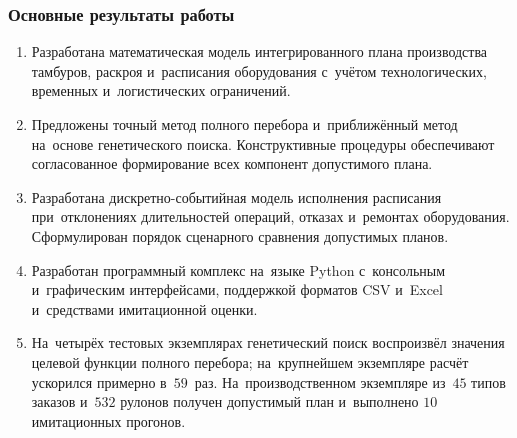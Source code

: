 \begin{frame}[t,allowframebreaks]
    \frametitle{Основные результаты работы}
    \small
    \begin{enumerate}
        \item Разработана математическая модель интегрированного плана производства тамбуров, раскроя и~расписания оборудования с~учётом технологических, временных и~логистических ограничений.
        \item Предложены точный метод полного перебора и~приближённый метод на~основе генетического поиска. Конструктивные процедуры обеспечивают согласованное формирование всех компонент допустимого плана.
        \item Разработана дискретно-событийная модель исполнения расписания при~отклонениях длительностей операций, отказах и~ремонтах оборудования. Сформулирован порядок сценарного сравнения допустимых планов.
        \item Разработан программный комплекс на~языке Python с~консольным и~графическим интерфейсами, поддержкой форматов CSV и~Excel и~средствами имитационной оценки.
        \item На~четырёх тестовых экземплярах генетический поиск воспроизвёл значения целевой функции полного перебора; на~крупнейшем экземпляре расчёт ускорился примерно в~$59$~раз. На~производственном экземпляре из~$45$ типов заказов и~$532$ рулонов получен допустимый план и~выполнено $10$ имитационных прогонов.
    \end{enumerate}
\end{frame}

